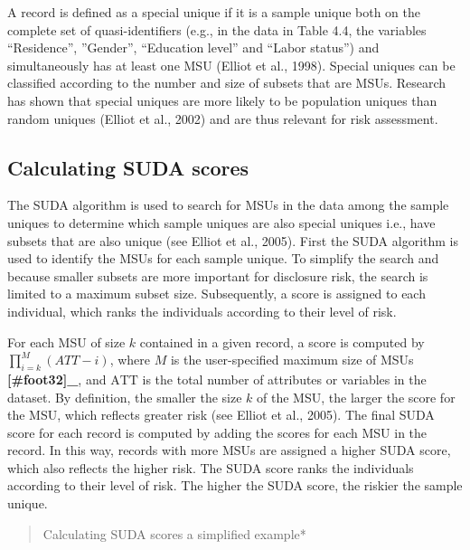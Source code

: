\documentclass[letterpaper,10pt,english]{sphinxmanual}
\begin{document}
A record is defined as a special unique if it is a sample unique both on
the complete set of quasi-identifiers (e.g., in the data in Table 4.4,
the variables “Residence”, ”Gender”, “Education level” and “Labor
status”) and simultaneously has at least one MSU (Elliot et al., 1998).
Special uniques can be classified according to the number and size of
subsets that are MSUs. Research has shown that special uniques are more
likely to be population uniques than random uniques (Elliot et al.,
2002) and are thus relevant for risk assessment.


\subsection{Calculating SUDA scores}
\label{\detokenize{measure_risk:calculating-suda-scores}}
The SUDA algorithm is used to search for MSUs in the data among the
sample uniques to determine which sample uniques are also special
uniques i.e., have subsets that are also unique (see Elliot et al.,
2005). First the SUDA algorithm is used to identify the MSUs for each
sample unique. To simplify the search and because smaller subsets are
more important for disclosure risk, the search is limited to a maximum
subset size. Subsequently, a score is assigned to each individual, which
ranks the individuals according to their level of risk.

For each MSU of size \(k\) contained in a given record, a score is
computed by \(\prod_{i = k}^{M}{(ATT - i)}\), where \(M\) is the
user-specified maximum size of MSUs {\color{red}\bfseries{}{[}\#foot32{]}\_}, and
\(\text{ATT}\) is the total number of attributes or variables in the
dataset. By definition, the smaller the size \(k\) of the MSU, the
larger the score for the MSU, which reflects greater risk (see Elliot et
al., 2005). The final SUDA score for each record is computed by adding
the scores for each MSU in the record. In this way, records with more
MSUs are assigned a higher SUDA score, which also reflects the higher
risk. The SUDA score ranks the individuals according to their level of
risk. The higher the SUDA score, the riskier the sample unique.
\begin{quote}

Calculating SUDA scores \textendash{} a simplified example*
\end{quote}
\end{document}
